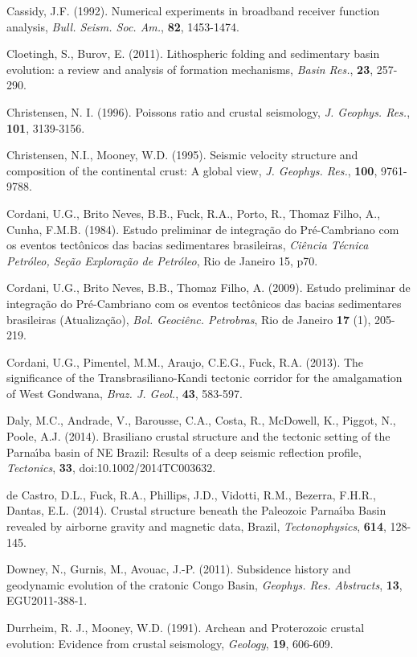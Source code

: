 \documentclass[manuscript,11pt]{geophysics}
\begin{document}
Cassidy, J.F. (1992). Numerical experiments in broadband receiver function analysis, \textit{Bull. Seism. Soc. Am.}, \textbf{82}, 1453-1474.

Cloetingh, S., Burov, E. (2011). Lithospheric folding and sedimentary basin evolution: a review and analysis of formation mechanisms, \textit{Basin Res.}, \textbf{23}, 257-290.

Christensen, N. I. (1996). Poissons ratio and crustal seismology, \textit{J. Geophys. Res.}, \textbf{101}, 3139-3156.

Christensen, N.I., Mooney, W.D. (1995). Seismic velocity structure and composition of the continental crust: A global view, \textit{J. Geophys. Res.}, \textbf{100}, 9761-9788.

Cordani, U.G., Brito Neves, B.B., Fuck, R.A., Porto, R., Thomaz Filho, A., Cunha, F.M.B. (1984). Estudo preliminar de integra\c{c}\~ao do Pr\'e-Cambriano com os eventos tect\^onicos das bacias sedimentares brasileiras, \textit{Ci\^encia T\'ecnica Petr\'oleo, Se\c{c}\~ao Explora\c{c}\~ao de Petr\'oleo}, Rio de Janeiro 15, p70.

Cordani, U.G., Brito Neves, B.B., Thomaz Filho, A. (2009). Estudo preliminar de integra\c{c}\~ao do Pr\'e-Cambriano com os eventos tect\^onicos das bacias sedimentares brasileiras (Atualiza\c{c}\~ao), \textit{Bol. Geoci\^enc. Petrobras}, Rio de Janeiro \textbf{17} (1), 205-219.

Cordani, U.G., Pimentel, M.M., Araujo, C.E.G., Fuck, R.A. (2013). The significance of the Transbrasiliano-Kandi tectonic corridor for the amalgamation of West Gondwana, \textit{Braz. J. Geol.}, \textbf{43}, 583-597.

Daly, M.C., Andrade, V., Barousse, C.A., Costa, R., McDowell, K., Piggot, N., Poole, A.J. (2014). Brasiliano crustal structure and the tectonic setting of the Parna\'{\i}ba basin of NE Brazil: Results of a deep seismic reflection profile, \textit{Tectonics}, \textbf{33}, doi:10.1002/2014TC003632.

de Castro, D.L., Fuck, R.A., Phillips, J.D., Vidotti, R.M., Bezerra, F.H.R., Dantas, E.L. (2014). Crustal structure beneath the Paleozoic Parna\'{\i}ba Basin revealed by airborne gravity and magnetic data, Brazil, \textit{Tectonophysics}, \textbf{614}, 128-145.

Downey, N., Gurnis, M., Avouac, J.-P. (2011). Subsidence history and geodynamic evolution of the cratonic Congo Basin, \textit{Geophys. Res. Abstracts}, \textbf{13}, EGU2011-388-1.

Durrheim, R. J., Mooney, W.D. (1991). Archean and Proterozoic crustal evolution: Evidence from crustal seismology, \textit{Geology}, \textbf{19}, 606-609.
\end{document}
